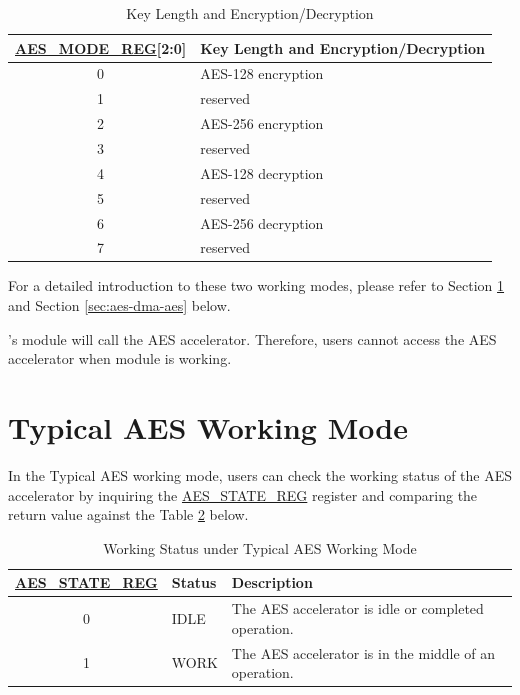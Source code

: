 \documentclass[main\_\_EN.tex]{subfiles}
\begin{document}
\begin{longtable}[c]{ | c | l | }
\caption{Key Length and Encryption/Decryption}
\label{tab:aes-operation}
\\\hline 
\rowcolor{lightgray}
\textbf{\hyperref[regdesc:AESMODEREG]{AES\_MODE\_REG}[2:0] }    & \textbf{Key Length and Encryption/Decryption}\\
    \hline
    0                   & AES-128 encryption    \\
    \hline
    1                   & reserved    \\
    \hline
    2                   & AES-256 encryption    \\
    \hline
    3                   & reserved    \\
    \hline
    4                   & AES-128 decryption    \\
    \hline
    5                   & reserved    \\
    \hline
    6                   & AES-256 decryption    \\
    \hline
    7                   & reserved    \\
    \hline
\end{longtable}

For a detailed introduction to these two working modes, please refer to Section \ref{sec:aes-typical-modes} and Section \ref{sec:aes-dma-aes} below.

\begin{importantlisting}
\vspace{-0.5em}

    \chipname{}'s  module will call the AES accelerator. Therefore, users cannot access the AES accelerator when  module is working.
\end{importantlisting}

\section{Typical AES Working Mode}\label{sec:aes-typical-modes}

In the Typical AES working mode, 
users can check the working status of the AES accelerator by inquiring the \hyperref[regdesc:AESSTATEREG]{AES\_STATE\_REG} register and comparing the return value against the Table \ref{tab:aes-state-value-typical} below.

\begin{longtable}[c]{ | c | l | l| }
\caption{Working Status under Typical AES Working Mode}
\label{tab:aes-state-value-typical}
\\\hline 
\rowcolor{lightgray}
\textbf{\hyperref[regdesc:AESSTATEREG]{AES\_STATE\_REG}} & \textbf{Status} &  \textbf{Description} \\ \hline

    0                   & IDLE      &   The AES accelerator is idle or completed operation.\\ \hline
    1                   & WORK      &   The AES accelerator is in the middle of an operation.     \\ \hline
\end{longtable}
\end{document}
